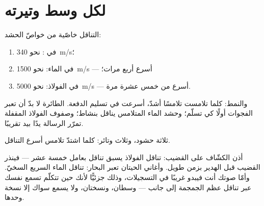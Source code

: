 \section{لكل وسط وتيرته}

\begin{proposition}\label{prop:g7:sound-production:speeds}
 التناقل خاصّية من خواصّ الحشد:
\begin{enumerate}
  \item في : نحو \qty{340}{m/s}؛
  \item في الماء: نحو \qty{1500}{m/s} --- أسرع أربع مرات؛
  \item في الفولاذ: نحو \qty{5000}{m/s} --- أسرع من 
        خمس عشرة مرة.
\end{enumerate}
والنمط: كلما تلامست   تلامسًا أشدّ، أسرعت في تسليم
الدفعة.   الطائرة لا بدّ أن تعبر الفجوات أولًا كي
تسلّم؛ وحشد الماء المتلامس يناقل بنشاط؛ وصفوف الفولاذ المقفلة
تمرّر الرسالة يدًا بيد تقريبًا.
\end{proposition}

\begin{omfigure}

{\small ثلاثة حشود، وثلاث وتائر: كلما اشتدّ تلامس 
أسرع التناقل.}
\end{omfigure}

\begin{example}\label{ex:g7:sound-production:scenes}
أذن الكشّاف على القضيب: تناقل الفولاذ يسبق تناقل  بعامل
خمسة عشر --- فينذر القضيب قبل الهدير بزمن طويل. وأغاني الحيتان
تعبر البحار: تناقل الماء السريع السخيّ. وأمّا صوتك أنت فيبدو
غريبًا في التسجيلات، وذلك جزئيًّا لأنك حين تتكلّم تسمع نفسك عبر
تناقل عظم الجمجمة إلى جانب  --- وسطان، ونسختان، ولا يسمع
سواك إلا نسخة  وحدها.
\end{example}

